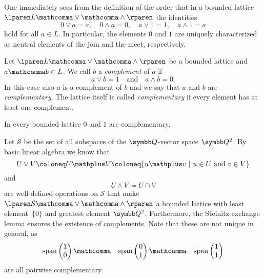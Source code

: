 \begin{remark}
  One immediately sees from the definition of the order that
  in a bounded lattice
  $\lparen L \mathcomma \vee \mathcomma \wedge \rparen$
  the identities
  \[
    0 \vee a \equal a,
    \quad
    0 \wedge a \equal 0,
    \quad
    a \vee 1 \equal 1,
    \quad
    a \wedge 1 \equal a
  \]
  hold for all $a \in L$.
  In particular,
  the elements $0$ and $1$ are uniquely characterized
  as neutral elements of the join and the meet, respectively.
\end{remark}

\begin{definition}
  Let
  $\lparen L \mathcomma \vee \mathcomma \wedge \rparen$
  be a bounded lattice and $a \mathcomma b \in L$.
  We call $b$ a \emph{complement} of $a$ if
  \[
    a \vee b \equal 1
    \quad \text{and} \quad
    a \wedge b \equal 0.
  \]
  In this case also $a$ is a complement of $b$
  and we say that $a$ and $b$ are \emph{complementary}.
  The lattice itself is called \emph{complementary}
  if every element has at least one complement.
\end{definition}

\begin{remark}
  In every bounded lattice $0$ and $1$ are complementary.
\end{remark}

\newpage

\begin{example}
  Let $\mathcal{S}$ be the set of all subspaces of the $\Q$-vector space $\Q^2$.
  By basic linear algebra we know that
  \[
    U \vee V
    \coloneq
    U \mathplus V
    \coloneq
    \lbrace
      u \mathplus v
    \pipe
      u \in U \text{ and } v \in V
    \rbrace
  \]
  and
  \[
    U \wedge V
    \coloneq
    U \cap V
  \]
  are well-defined operations on $\mathcal{S}$ that make
  $\lparen \mathcal{S} \mathcomma \vee \mathcomma \wedge \rparen$
  a bounded lattice
  with least element~$\lbrace 0 \rbrace$
  and greatest element $\Q^2$.
  Furthermore, the Steinitz exchange lemma
  ensures the existence of complements.
  Note that these are not unique in general, as
  \[
  \mathrm{span}
  \begin{pmatrix}
    1 \\
    0
  \end{pmatrix}
  \mathcomma
  \quad
  \mathrm{span}
  \begin{pmatrix}
    0 \\
    1
  \end{pmatrix}
  \mathcomma
  \quad
  \mathrm{span}
  \begin{pmatrix}
    1 \\
    1
  \end{pmatrix}
  \]
  are all pairwise complementary.
\end{example}

